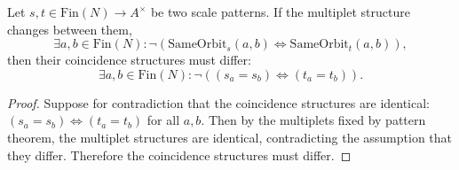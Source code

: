 \begin{theorem}
Let $s, t \in \text{Fin}(N) \to A^\times$ be two scale patterns. If the multiplet structure changes between them,
\[
\exists a, b \in \text{Fin}(N) : \neg(\text{SameOrbit}_s(a, b) \iff \text{SameOrbit}_t(a, b)),
\]
then their coincidence structures must differ:
\[
\exists a, b \in \text{Fin}(N) : \neg((s_a = s_b) \iff (t_a = t_b)).
\]
\begin{proof}
Suppose for contradiction that the coincidence structures are identical: $(s_a = s_b) \iff (t_a = t_b)$ for all $a, b$. Then by the multiplets fixed by pattern theorem, the multiplet structures are identical, contradicting the assumption that they differ. Therefore the coincidence structures must differ.
\end{proof}
\end{theorem}

